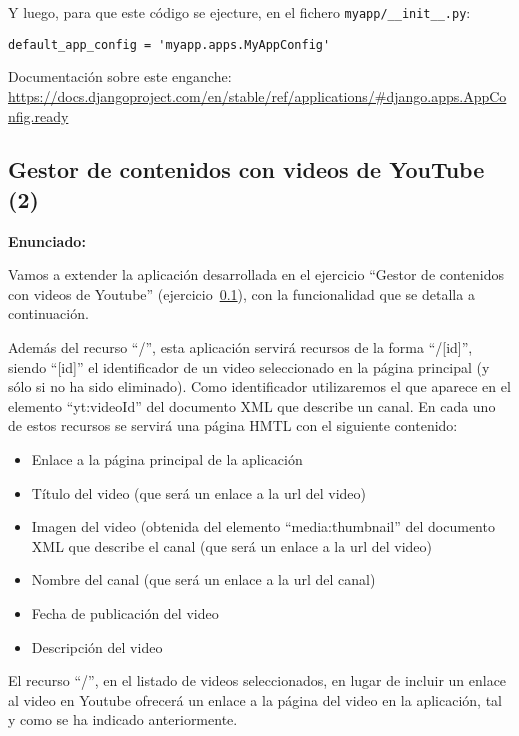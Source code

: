 Y luego, para que este código se ejecture, en el fichero \verb|myapp/__init__.py|:

\begin{verbatim}
default_app_config = 'myapp.apps.MyAppConfig'
\end{verbatim}

Documentación sobre este enganche: \\
\url{https://docs.djangoproject.com/en/stable/ref/applications/#django.apps.AppConfig.ready}

\subsection{Gestor de contenidos con videos de YouTube (2)}
\label{subsec:django-cms-youtube-2}

\textbf{Enunciado:}

Vamos a extender la aplicación desarrollada en el ejercicio ``Gestor de contenidos con videos de Youtube'' (ejercicio~\ref{subsec:django-cms-youtube-2}), con la funcionalidad que se detalla a continuación.

Además del recurso ``/'', esta aplicación servirá recursos de la forma ``/[id]'', siendo ``[id]'' el identificador de un video seleccionado en la página principal (y sólo si no ha sido eliminado). Como identificador utilizaremos el que aparece en el elemento ``yt:videoId'' del documento XML que describe un canal. En cada uno de estos recursos se servirá una página HMTL con el siguiente contenido:

\begin{itemize}
\item Enlace a la página principal de la aplicación
\item Título del video (que será un enlace a la url del video)
\item Imagen del video (obtenida del elemento ``media:thumbnail'' del documento XML que describe el canal (que será un enlace a la url del video)
\item Nombre del canal (que será un enlace a la url del canal)
\item Fecha de publicación del video
\item Descripción del video
\end{itemize}

El recurso ``/'', en el listado de videos seleccionados, en lugar de incluir un enlace al video en Youtube ofrecerá un enlace a la página del video en la aplicación, tal y como se ha indicado anteriormente.

